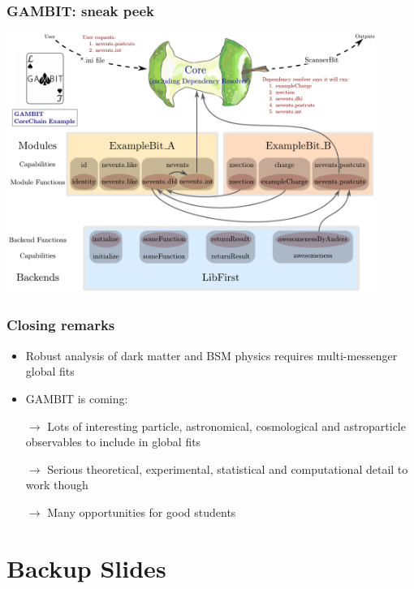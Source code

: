 \documentclass[xcolor=dvipsnames]{beamer}
\begin{document}
\begin{frame}
\frametitle{GAMBIT: sneak peek}
\centering
\includegraphics[width=0.9\textwidth]{coreChainDiagram_example_wlogo}	
\end{frame}


\begin{frame}
\frametitle{Closing remarks}

\begin{itemize}
\item{Robust analysis of dark matter and BSM physics requires multi-messenger global fits}
\item{GAMBIT is coming:}\bi
\item[$\rightarrow$]{\alert{Lots} of interesting particle, astronomical, cosmological and astroparticle observables to include in global fits}
\item[$\rightarrow$]{Serious theoretical, experimental, statistical and computational detail to work though}
\item[$\rightarrow$]{\alert{Many} opportunities for good students}\ei
\end{itemize}


\end{frame}

\appendix

\section{Backup Slides}
\end{document}
